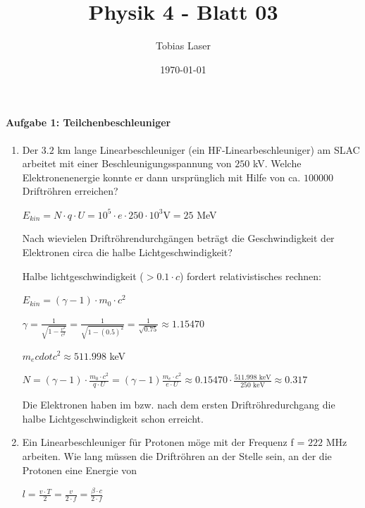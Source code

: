 \documentclass[11pt,a4paper]{scrartcl}
\begin{document}
\title{Physik 4 - Blatt 03}
\author{Tobias Laser}
\date{\today}
\maketitle
\vfill
\thispagestyle{empty}


\paragraph{Aufgabe 1: Teilchenbeschleuniger}

\begin{enumerate}[label=(\alph*)]
    \item Der $3.2$ km lange Linearbeschleuniger (ein HF-Linearbeschleuniger) am SLAC arbeitet mit einer Beschleunigungsspannung von $250$ kV. Welche Elektronenenergie konnte er dann ursprünglich mit Hilfe von ca. $100000$ Driftröhren erreichen? 
    \begin{calculationbox}
        $E_{kin} = N \cdot q \cdot U = 10^5 \cdot e \cdot 250 \cdot 10^3 \text{V} = 25$ MeV
    \end{calculationbox}
    Nach wievielen Driftröhrendurchgängen beträgt die Geschwindigkeit der Elektronen circa die halbe Lichtgeschwindigkeit?
    \begin{calculationbox}
        Halbe lichtgeschwindigkeit ($> 0.1 \cdot c$) fordert relativistisches rechnen:

        $E_{kin}= \left(\gamma - 1\right) \cdot m_0 \cdot c^2$

        $\gamma = \frac{1}{\sqrt{1-\frac{v^2}{c^2}}} = \frac{1}{\sqrt{1-(0.5)^2}} = \frac{1}{\sqrt{0.75}} \approx 1.15470$

        $m_e cdot c^2 \approx 511.998$ keV

        $N = (\gamma - 1) \cdot \frac{m_0 \cdot c^2}{q \cdot U} = (\gamma - 1)\frac{m_e \cdot c^2}{e \cdot U} \approx 0.15470 \cdot \frac{511.998 \text{ keV}}{250 \text{ keV}} \approx 0.317$

        Die Elektronen haben im bzw. nach dem ersten Driftröhredurchgang die halbe Lichtgeschwindigkeit schon erreicht.

    \end{calculationbox}
    \item Ein Linearbeschleuniger für Protonen möge mit der Frequenz f = $222$ MHz arbeiten. Wie lang müssen die Driftröhren an der Stelle sein, an der die Protonen eine Energie von
    \begin{calculationbox}
        $l = \frac{v\cdot T}{2} = \frac{v}{2\cdot f} =\frac{\beta \cdot c}{2 \cdot f}$



\end{calculationbox}
\end{enumerate}
\end{document}
